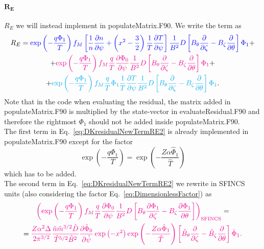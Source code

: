\documentclass[12pt]{article}
\newcommand{\p}{\partial}
\begin{document}
\paragraph*{$\bm{R_E}$}
$R_E$ we will instead implement in populateMatrix.F90. We write the term as 
\begin{multline}
R_E = \textcolor{blue}{
\exp \left(- \frac{q \Phi_1}{T}  \right) f_{M} \left[\frac{1}{n} \frac{\p n}{\p \psi}  + \left(x^2 - \frac{3}{2} \right) \frac{1}{T} \frac{\p T}{\p \psi}\right] \frac{1}{B^2} D \left[B_\theta \frac{\p }{\p \zeta} - B_\zeta \frac{\p }{\p \theta}\right] \Phi_1} + \\ +
\textcolor{magenta}{
\exp \left(- \frac{q \Phi_1}{T}  \right) f_{M} \frac{q}{T} \frac{\p \Phi_0}{\p \psi} \frac{1}{B^2} D \left[B_\theta \frac{\p }{\p \zeta} - B_\zeta \frac{\p }{\p \theta}\right]\Phi_1 } + \\ +
 \textcolor{cyan}{
 \exp \left(- \frac{q \Phi_1}{T}  \right) f_{M} \frac{q}{T} \Phi_1 \frac{1}{T} \frac{\p T}{\p \psi} \frac{1}{B^2} D \left[B_\theta \frac{\p }{\p \zeta} - B_\zeta \frac{\p }{\p \theta}\right] \Phi_1}.
\label{eq:DKresidualNewTermRE2}
\end{multline}
Note that in the code when evaluating the residual, the matrix added in populateMatrix.F90 is multiplied by the state-vector in evaluateResidual.F90 and therefore the rightmost $\Phi_1$ should not be added inside populateMatrix.F90.\\
The first term in Eq.~\ref{eq:DKresidualNewTermRE2} is already implemented in populateMatrix.F90 except for the factor 
\[
\exp \left(- \frac{q \Phi_1}{T}  \right) = \exp \left(- \frac{Z \alpha \hat{\Phi}_1}{\hat{T}}  \right)
\]
which has to be added.\\
The second term in Eq.~\ref{eq:DKresidualNewTermRE2} we rewrite in SFINCS units (also considering the factor Eq.~\ref{eq:DimensionlessFactor}) as
\begin{multline}
\textcolor{magenta}{
\left(\exp \left(- \frac{q \Phi_1}{T}  \right) f_{M} \frac{q}{T} \frac{\p \Phi_0}{\p \psi} \frac{1}{B^2} D \left[B_\theta \frac{\p \Phi_1}{\p \zeta} - B_\zeta \frac{\p \Phi_1}{\p \theta}\right] \right)_{\mathrm{SFINCS}} } = \\ = \textcolor{magenta}{
\frac{Z \alpha^2 \Delta}{2 \pi^{3/2}} \frac{\hat{n} \hat{m}^{3/2} \hat{D}}{\hat{T}^{5/2} \hat{B}^2 } \frac{\p \hat{\Phi}_0}{\p \hat{\psi}} 
\exp\left(-x^2\right) \exp \left(- \frac{Z \alpha \hat{\Phi}_1}{\hat{T}}\right) \left[\hat{B}_{\theta} \frac{\p}{\p \zeta} - \hat{B}_{\zeta} \frac{\p}{\p \theta}\right] \hat{\Phi}_1.
}
\label{eq:REterm2}
\end{multline}
\end{document}
